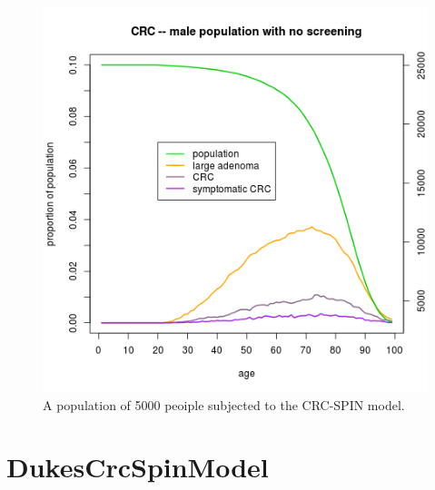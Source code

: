 \documentclass[11pt]{article}
\begin{document}
\begin{figure}[tbhp]
  \centering
  \includegraphics[totalheight=9cm]{./figs/CrcSpinModel.png}
  \caption{A population of 5000 peoiple subjected to the CRC-SPIN model.}
  \label{figure:CrcSpinModel.png}
\end{figure}

\FloatBarrier
\section{DukesCrcSpinModel}
\end{document}
